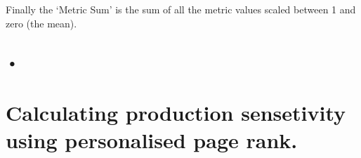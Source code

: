 Finally the `Metric Sum' is the sum of all the metric values scaled between 1 and zero (the mean).

\subsection{•}




\section{Calculating production sensetivity using personalised page rank.}


